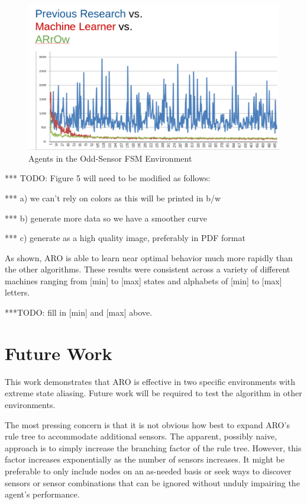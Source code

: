 \documentclass[letterpaper]{article} %
\begin{document}
\begin{figure}[t]
  \centering
  \includegraphics[width=0.9\columnwidth]{OSFSMResult.png} %
  \caption{Agents in the Odd-Sensor FSM Environment}
  \label{fig5}
\end{figure}

*** TODO: Figure 5 will need to be modified as follows:

***    a) we can't rely on colors as this will be printed in b/w

***    b) generate more data so we have a smoother curve

***    c) generate as a high quality image, preferably in PDF format


As shown, ARO is able to learn near optimal behavior much more rapidly
than the other algorithms.  These results were consistent across a
variety of different machines ranging from [min] to [max] states and
alphabets of [min] to [max] letters.

***TODO:  fill in [min] and [max] above.

\section{Future Work}

This work demonstrates that ARO is effective in two specific
environments with extreme state aliasing.  Future work will be
required to test the algorithm in other environments.

The most pressing concern is that it is not obvious how best to expand
ARO's rule tree to accommodate additional sensors.  The apparent,
possibly naive, approach is to simply increase the branching factor of
the rule tree.  However, this factor increases exponentially as the
number of sensors increases.  It might be preferable to only include
nodes on an as-needed basis or seek ways to discover sensors or sensor
combinations that can be ignored without unduly impairing the agent's
performance.
\end{document}
